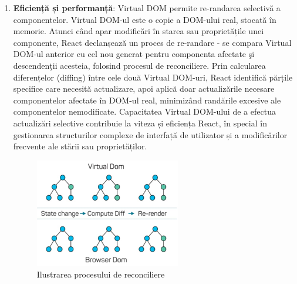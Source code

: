 \documentclass[12pt, a4paper]{report}
\begin{document}
\begin{enumerate}
	\item \textbf{Eficiență și performanță}: Virtual DOM permite re-randarea selectivă a componentelor. Virtual DOM-ul este o copie a DOM-ului real, stocată în memorie. Atunci când apar modificări în starea sau proprietățile unei componente, React declanșează un proces de re-randare - se compara Virtual DOM-ul anterior cu cel nou generat pentru componenta afectate \c si descenden\c tii acesteia, folosind procesul de reconciliere. Prin calcularea diferențelor (diffing) între cele două Virtual DOM-uri, React identifică părțile specifice care necesită actualizare, apoi aplică doar actualizările necesare componentelor afectate în DOM-ul real, minimizând rand\u arile excesive ale componentelor nemodificate. Capacitatea Virtual DOM-ului de a efectua actualizări selective contribuie la viteza și eficiența React, în special în gestionarea structurilor complexe de interfață de utilizator și a modificărilor frecvente ale stării sau proprietăților.
	\begin{figure}[htbp]
		\centering
		\includegraphics[width=0.6\textwidth]{virtual-dom.jpeg}
		\caption{Ilustrarea procesului de reconciliere}\protect\footnotemark
		\label{fig:virtual-dom}
	\end{figure}


\end{enumerate}
\end{document}
